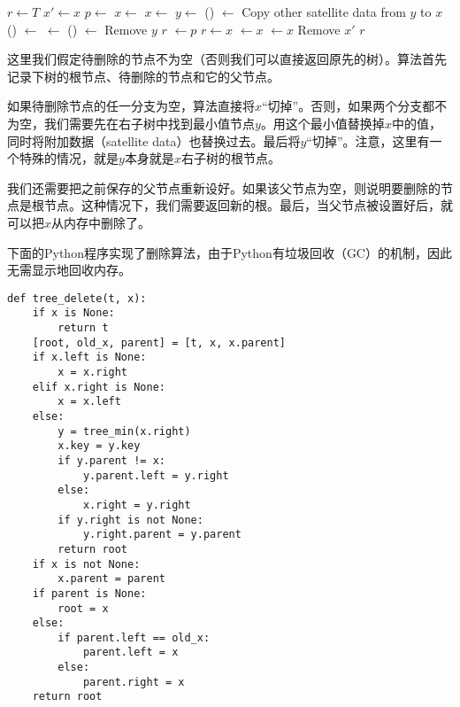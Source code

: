 \documentclass{ctexart}
\begin{document}
\begin{algorithmic}[1]
  \State $r \gets T$
  \State $x' \gets x$ 
  \State $p \gets $ 
    \State $x \gets $ 
    \State $x \gets $ 
  \Else
    \State  $y \gets $ ()
    \State {} $\gets$ 
    \State Copy other satellite data from $y$ to $x$
      \State {}() $\gets$ 
    \Else
      \State {} $\gets$ 
    \EndIf
      \State {}() $\gets$ 
    \EndIf
    \State Remove $y$
    \State \Return $r$
  \EndIf
    \State {} $\gets p$
  \EndIf
    \State $r \gets x$
  \Else
      \State {} $\gets x$
    \Else
      \State {} $\gets x$
    \EndIf
  \EndIf
  \State Remove $x'$
  \State \Return $r$
\EndFunction
\end{algorithmic}

这里我们假定待删除的节点不为空（否则我们可以直接返回原先的树）。算法首先记录下树的根节点、待删除的节点和它的父节点。

如果待删除节点的任一分支为空，算法直接将$x$“切掉”。否则，如果两个分支都不为空，我们需要先在右子树中找到最小值节点$y$。用这个最小值替换掉$x$中的值，同时将附加数据（satellite data）也替换过去。最后将$y$“切掉”。注意，这里有一个特殊的情况，就是$y$本身就是$x$右子树的根节点。

我们还需要把之前保存的父节点重新设好。如果该父节点为空，则说明要删除的节点是根节点。这种情况下，我们需要返回新的根。最后，当父节点被设置好后，就可以把$x$从内存中删除了。

下面的Python程序实现了删除算法，由于Python有垃圾回收（GC）的机制，因此无需显示地回收内存。

\lstset{language=Python}
\begin{lstlisting}
def tree_delete(t, x):
    if x is None:
        return t
    [root, old_x, parent] = [t, x, x.parent]
    if x.left is None:
        x = x.right
    elif x.right is None:
        x = x.left
    else:
        y = tree_min(x.right)
        x.key = y.key
        if y.parent != x:
            y.parent.left = y.right
        else:
            x.right = y.right
        if y.right is not None:
            y.right.parent = y.parent
        return root
    if x is not None:
        x.parent = parent
    if parent is None:
        root = x
    else:
        if parent.left == old_x:
            parent.left = x
        else:
            parent.right = x
    return root
\end{lstlisting}
\end{document}
